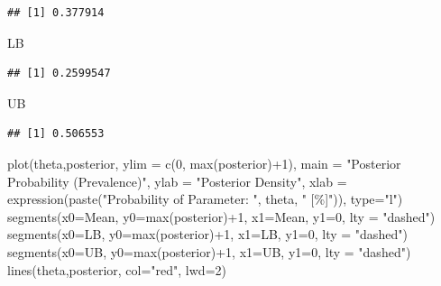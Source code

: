 \documentclass[
]{book}
\newenvironment{Shaded}{\begin{snugshade}}{\end{snugshade}}
\newcommand{\AttributeTok}[1]{\textcolor[rgb]{0.77,0.63,0.00}{#1}}
\newcommand{\DecValTok}[1]{\textcolor[rgb]{0.00,0.00,0.81}{#1}}
\newcommand{\FunctionTok}[1]{\textcolor[rgb]{0.00,0.00,0.00}{#1}}
\newcommand{\NormalTok}[1]{#1}
\newcommand{\SpecialCharTok}[1]{\textcolor[rgb]{0.00,0.00,0.00}{#1}}
\newcommand{\StringTok}[1]{\textcolor[rgb]{0.31,0.60,0.02}{#1}}
\begin{document}
\begin{verbatim}
## [1] 0.377914
\end{verbatim}

\begin{Shaded}
\begin{Highlighting}[]
\NormalTok{LB}
\end{Highlighting}
\end{Shaded}

\begin{verbatim}
## [1] 0.2599547
\end{verbatim}

\begin{Shaded}
\begin{Highlighting}[]
\NormalTok{UB}
\end{Highlighting}
\end{Shaded}

\begin{verbatim}
## [1] 0.506553
\end{verbatim}

\begin{Shaded}
\begin{Highlighting}[]
\FunctionTok{plot}\NormalTok{(theta,posterior, }\AttributeTok{ylim =} \FunctionTok{c}\NormalTok{(}\DecValTok{0}\NormalTok{, }\FunctionTok{max}\NormalTok{(posterior)}\SpecialCharTok{+}\DecValTok{1}\NormalTok{), }\AttributeTok{main =} \StringTok{"Posterior Probability (Prevalence)"}\NormalTok{, }\AttributeTok{ylab =} \StringTok{"Posterior Density"}\NormalTok{, }\AttributeTok{xlab =} \FunctionTok{expression}\NormalTok{(}\FunctionTok{paste}\NormalTok{(}\StringTok{"Probability of Parameter: "}\NormalTok{, theta, }\StringTok{" [\%]"}\NormalTok{)), }\AttributeTok{type=}\StringTok{"l"}\NormalTok{)}
\FunctionTok{segments}\NormalTok{(}\AttributeTok{x0=}\NormalTok{Mean, }\AttributeTok{y0=}\FunctionTok{max}\NormalTok{(posterior)}\SpecialCharTok{+}\DecValTok{1}\NormalTok{, }\AttributeTok{x1=}\NormalTok{Mean, }\AttributeTok{y1=}\DecValTok{0}\NormalTok{, }\AttributeTok{lty =} \StringTok{"dashed"}\NormalTok{)}
\FunctionTok{segments}\NormalTok{(}\AttributeTok{x0=}\NormalTok{LB, }\AttributeTok{y0=}\FunctionTok{max}\NormalTok{(posterior)}\SpecialCharTok{+}\DecValTok{1}\NormalTok{, }\AttributeTok{x1=}\NormalTok{LB, }\AttributeTok{y1=}\DecValTok{0}\NormalTok{, }\AttributeTok{lty =} \StringTok{"dashed"}\NormalTok{)}
\FunctionTok{segments}\NormalTok{(}\AttributeTok{x0=}\NormalTok{UB, }\AttributeTok{y0=}\FunctionTok{max}\NormalTok{(posterior)}\SpecialCharTok{+}\DecValTok{1}\NormalTok{, }\AttributeTok{x1=}\NormalTok{UB, }\AttributeTok{y1=}\DecValTok{0}\NormalTok{, }\AttributeTok{lty =} \StringTok{"dashed"}\NormalTok{)}
\FunctionTok{lines}\NormalTok{(theta,posterior, }\AttributeTok{col=}\StringTok{"red"}\NormalTok{, }\AttributeTok{lwd=}\DecValTok{2}\NormalTok{)}
\end{Highlighting}
\end{Shaded}
\end{document}

